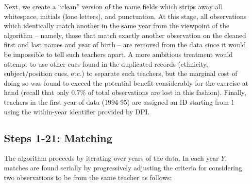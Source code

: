 \begin{appendices}
Next, we create a ``clean'' version of the name fields which strips away
all whitespace, initials (lone letters), and punctuation. At this stage,
all observations which identically match another in the same year from
the viewpoint of the algorithm -- namely, those that match exactly
another observation on the cleaned first and last names and year of
birth -- are removed from the data since it would be impossible to tell
such teachers apart. A more ambitious treatment would attempt to use
other cues found in the duplicated records (ethnicity, subject/position
cues, etc.) to separate such teachers, but the marginal cost of doing so
was found to exceed the potential benefit considerably for the exercise
at hand (recall that only 0.7\% of total observations are lost in this
fashion). Finally, teachers in the first year of data (1994-95) are
assigned an ID starting from 1 using the within-year identifier provided
by DPI.

\subsection{Steps 1-21: Matching}\label{steps-1-21-matching}

The algorithm proceeds by iterating over years of the data. In each year
\(Y\), matches are found serially by progressively adjusting the
criteria for considering two observations to be from the same teacher as
follows:


\end{appendices}
